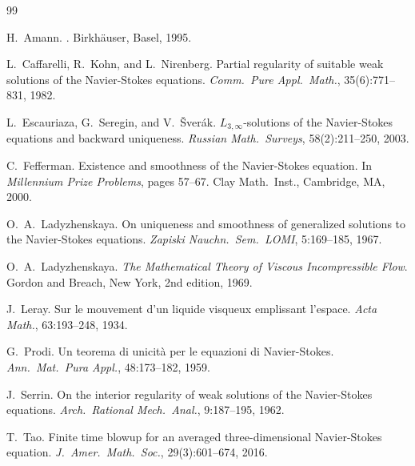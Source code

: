 \documentclass[12pt]{article}
\theoremstyle{plain}
\theoremstyle{definition}
\theoremstyle{remark}
\begin{document}

\begin{thebibliography}{99}

H.\ Amann.
.
\newblock Birkh\"auser, Basel, 1995.

L.\ Caffarelli, R.\ Kohn, and L.\ Nirenberg.
\newblock Partial regularity of suitable weak solutions of the {Navier-Stokes}
  equations.
\newblock \textit{Comm.\ Pure Appl.\ Math.}, 35(6):771--831, 1982.

L.\ Escauriaza, G.\ Seregin, and V.\ \v{S}ver\'ak.
\newblock $L_{3,\infty}$-solutions of the {Navier-Stokes} equations and backward
  uniqueness.
\newblock \textit{Russian Math.\ Surveys}, 58(2):211--250, 2003.

C.\ Fefferman.
\newblock Existence and smoothness of the {Navier-Stokes} equation.
\newblock In \textit{Millennium Prize Problems}, pages 57--67.
  Clay Math.\ Inst., Cambridge, MA, 2000.

O.\ A.\ Ladyzhenskaya.
\newblock On uniqueness and smoothness of generalized solutions to the
  {Navier-Stokes} equations.
\newblock \textit{Zapiski Nauchn.\ Sem.\ LOMI}, 5:169--185, 1967.

O.\ A.\ Ladyzhenskaya.
\newblock \textit{The Mathematical Theory of Viscous Incompressible Flow}.
\newblock Gordon and Breach, New York, 2nd edition, 1969.

J.\ Leray.
\newblock Sur le mouvement d'un liquide visqueux emplissant l'espace.
\newblock \textit{Acta Math.}, 63:193--248, 1934.

G.\ Prodi.
\newblock Un teorema di unicità per le equazioni di {Navier-Stokes}.
\newblock \textit{Ann.\ Mat.\ Pura Appl.}, 48:173--182, 1959.

J.\ Serrin.
\newblock On the interior regularity of weak solutions of the {Navier-Stokes}
  equations.
\newblock \textit{Arch.\ Rational Mech.\ Anal.}, 9:187--195, 1962.

T.\ Tao.
\newblock Finite time blowup for an averaged three-dimensional {Navier-Stokes}
  equation.
\newblock \textit{J.\ Amer.\ Math.\ Soc.}, 29(3):601--674, 2016.


\end{thebibliography}
\end{document}
